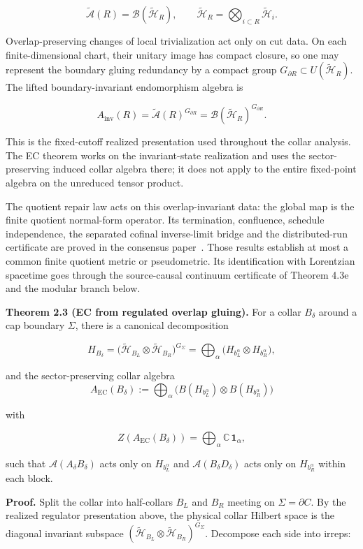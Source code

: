 \[
\widetilde{\mathcal A}(R)=\mathcal B(\tilde{\mathcal H}_R),
\qquad
\tilde{\mathcal H}_R=\bigotimes_{i\subset R}\tilde{\mathcal H}_i.
\]

Overlap-preserving changes of local trivialization act only on cut data. On each finite-dimensional chart, their unitary image has compact closure, so one may represent the boundary gluing redundancy by a compact group \(G_{\partial R}\subset U(\tilde{\mathcal H}_R)\). The lifted boundary-invariant endomorphism algebra is

\[
A_{\mathrm{inv}}(R)=\widetilde{\mathcal A}(R)^{G_{\partial R}}
=\mathcal B(\tilde{\mathcal H}_R)^{G_{\partial R}}.
\]

This is the fixed-cutoff realized presentation used throughout the collar analysis. The EC theorem works on the invariant-state realization and uses the sector-preserving induced collar algebra there; it does not apply to the entire fixed-point algebra on the unreduced tensor product.

The quotient repair law acts on this overlap-invariant data: the global map is the finite
quotient normal-form operator. Its termination, confluence, schedule independence, the
separated cofinal inverse-limit bridge and the distributed-run certificate are proved in the
consensus paper~\cite{ophconsensus}. Those results establish at most a common finite quotient
metric or pseudometric. Its identification with Lorentzian spacetime goes through the
source-causal continuum certificate of Theorem 4.3e and the modular branch below.

\textbf{Theorem 2.3 (EC from regulated overlap gluing).} For a collar \(B_\delta\) around a cap boundary \(\Sigma\), there is a canonical decomposition

\[
H_{B_\delta} = \bigl(\tilde{\mathcal H}_{B_L}\otimes \tilde{\mathcal H}_{B_R}\bigr)^{G_\Sigma}
= \bigoplus_{\alpha}
\bigl(H_{b_L^{\alpha}} \otimes H_{b_R^{\alpha}}\bigr),
\]

and the sector-preserving collar algebra
\[
A_{\mathrm{EC}}(B_\delta):=\bigoplus_\alpha
\bigl(B(H_{b_L^\alpha}) \otimes B(H_{b_R^\alpha})\bigr)
\]

with

\[
Z(A_{\mathrm{EC}}(B_\delta)) = \bigoplus_\alpha \mathbb C\,\mathbf 1_\alpha,
\]

such that \(\mathcal{A}(A_\delta B_\delta)\) acts only on \(H_{b_L^\alpha}\) and \(\mathcal{A}(B_\delta D_\delta)\) acts only on \(H_{b_R^\alpha}\) within each block.

\textbf{Proof.} Split the collar into half-collars \(B_L\) and \(B_R\) meeting on \(\Sigma = \partial C\). By the realized regulator presentation above, the physical collar Hilbert space is the diagonal invariant subspace \((\tilde{\mathcal H}_{B_L} \otimes \tilde{\mathcal H}_{B_R})^{G_\Sigma}\). Decompose each side into irreps:


